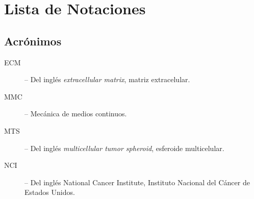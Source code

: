 \chapter*{Lista de Notaciones}
\section*{Acr\'onimos}
\begin{description}
\item [ECM] -- Del ingl\'es \emph{extracellular matrix}, matriz extracelular. 
\item [MMC] -- Mec\'anica de medios continuos. 
\item [MTS] -- Del ingl\'es \emph{multicellular tumor spheroid}, esferoide multicelular. 
\item [NCI] -- Del ingl\'es National Cancer Institute, Instituto Nacional del C\'ancer de Estados Unidos.
\end{description}

